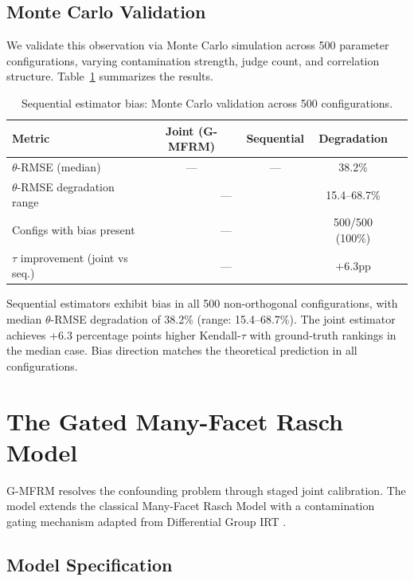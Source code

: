 \documentclass[11pt]{article}
\newcommand{\gmfrm}{G-MFRM}
\begin{document}
\subsection{Monte Carlo Validation}

We validate this observation via Monte Carlo simulation across 500 parameter configurations, varying contamination strength, judge count, and correlation structure. Table~\ref{tab:monte_carlo} summarizes the results.

\begin{table}[t]
\centering
\caption{Sequential estimator bias: Monte Carlo validation across 500 configurations.}
\label{tab:monte_carlo}
\small
\begin{tabular}{lcccc}
\toprule
Metric & Joint (\gmfrm{}) & Sequential & Degradation \\
\midrule
$\theta$-RMSE (median) & --- & --- & 38.2\% \\
$\theta$-RMSE degradation range & \multicolumn{2}{c}{---} & 15.4--68.7\% \\
Configs with bias present & \multicolumn{2}{c}{---} & 500/500 (100\%) \\
$\tau$ improvement (joint vs seq.) & \multicolumn{2}{c}{---} & $+6.3$pp \\
\bottomrule
\end{tabular}
\end{table}

Sequential estimators exhibit bias in all 500 non-orthogonal configurations, with median $\theta$-RMSE degradation of 38.2\% (range: 15.4--68.7\%). The joint estimator achieves +6.3 percentage points higher Kendall-$\tau$ with ground-truth rankings in the median case. Bias direction matches the theoretical prediction in all configurations.

\section{The Gated Many-Facet Rasch Model}
\label{sec:method}

\gmfrm{} resolves the confounding problem through staged joint calibration. The model extends the classical Many-Facet Rasch Model \citep{linacre1989mfrm} with a contamination gating mechanism adapted from Differential Group IRT \citep{soares2023dgirt}.

\subsection{Model Specification}
\end{document}
